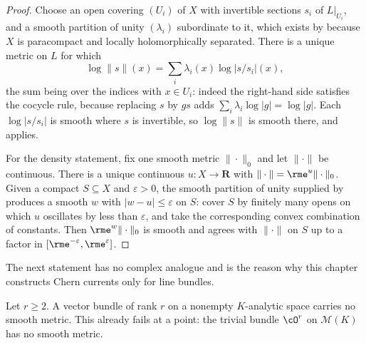 \begin{proof}
Choose an open covering $(U_i)$ of $X$ with invertible sections $s_i$
of $L|_{U_i}$, and a smooth partition of unity $(\lambda_i)$
subordinate to it, which exists by  because
$X$ is paracompact and locally holomorphically separated.  There is a
unique metric on $L$ for which
\[
 \log\|s\|(x)=\sum_i\lambda_i(x)\log|s/s_i|(x),
\]
the sum being over the indices with $x\in U_i$: indeed the right-hand
side satisfies the cocycle rule, because replacing $s$ by $gs$ adds
$\sum_i\lambda_i\log|g|=\log|g|$.  Each $\log|s/s_i|$ is smooth where
$s$ is invertible, so $\log\|s\|$ is smooth there, and
 applies.

For the density statement, fix one smooth metric $\|\cdot\|_0$ and let
$\|\cdot\|$ be continuous.  There is a unique continuous
$u:X\to\mathbf R$ with $\|\cdot\|=\rme^{u}\|\cdot\|_0$.  Given a compact
$S\subseteq X$ and $\varepsilon>0$, the smooth partition of unity
supplied by  produces a smooth $w$ with
$|w-u|\le\varepsilon$ on $S$: cover $S$ by finitely many opens on
which $u$ oscillates by less than $\varepsilon$, and take the
corresponding convex combination of constants.  Then
$\rme^{w}\|\cdot\|_0$ is smooth and agrees with $\|\cdot\|$ on $S$ up
to a factor in $[\rme^{-\varepsilon},\rme^{\varepsilon}]$.
\end{proof}

The next statement has no complex analogue and is the reason why this
chapter constructs Chern currents only for line bundles.

\begin{proposition}
\label{prop:ch17-no-smooth-higher-rank}
Let $r\ge2$.  A vector bundle of rank $r$ on a nonempty
$K$-analytic space carries no smooth metric.  This already fails at a
point: the trivial bundle $\cO^{r}$ on $\mathcal M(K)$ has no smooth
metric.
\end{proposition}

